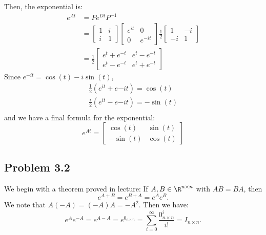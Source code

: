 \documentclass{homework}
\begin{document}
\begin{letterenum}
    Then, the exponential is:
    \begin{align}
        e^{At} &= P e^{Dt} P^{-1} \\
            &= \begin{bmatrix}
                1 & i \\ i & 1
            \end{bmatrix} \begin{bmatrix}
                e^{it} & 0 \\ 0 & e^{-it}
            \end{bmatrix} \frac{1}{2} \begin{bmatrix}
                1 & -i \\ -i & 1
            \end{bmatrix} \\
            &= \frac{1}{2} \begin{bmatrix}
                e^t + e^{-t} & e^t - e^{-t} \\ e^t - e^{-t} & e^t + e^{-t}
            \end{bmatrix}
    \end{align}
    Since $e^{-it} = \cos(t) - i \sin(t)$,
    \begin{align}
        \frac{1}{2} (e^{it} + e{-it}) = \cos(t) \\
        \frac{i}{2} (e^{it} - e{-it}) = -\sin(t) \\
    \end{align}
    and we have a final formula for the exponential:
    \begin{equation}
        e^{At} = \boxed{\begin{bmatrix}
            \cos(t) & \sin(t) \\
            -\sin(t) & \cos(t)
        \end{bmatrix}}
    \end{equation}

\end{letterenum}

\subsection{Problem 3.2}
We begin with a theorem proved in lecture: If $A,B \in \R^{n \times n}$ with
$AB = BA$, then
\begin{equation}
    e^{A+B} = e^{B+A} = e^A e^B.
    \label{eq:exp-multiplication-law}
\end{equation}
We note that $A(-A) = (-A)A = -A^2$. Then we have:
\begin{equation}
    e^A e^{-A} = e^{A-A} = e^{0_{n \times n}} =
        \sum_{i=0}^{\infty} \frac{0_{n \times n}^i}{i!} = I_{n \times n}.
\end{equation}
\end{document}
